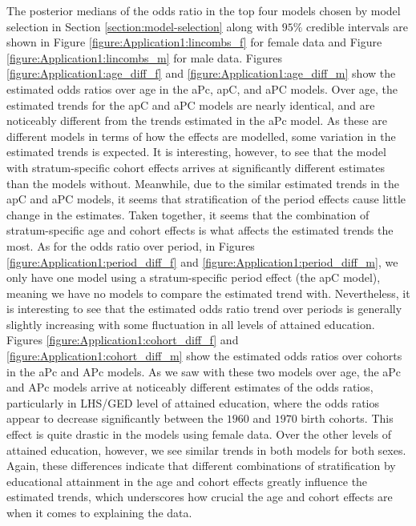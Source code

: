 \vspace{-0.2cm}
The posterior medians of the odds ratio in the top four models chosen by model selection in Section \ref{section:model-selection} along with $95\%$ credible intervals are shown in Figure \ref{figure:Application1:lincombs_f} for female data and Figure \ref{figure:Application1:lincombs_m} for male data. Figures \ref{figure:Application1:age_diff_f} and \ref{figure:Application1:age_diff_m} show the estimated odds ratios over age in the aPc, apC, and aPC models. Over age, the estimated trends for the apC and aPC models are nearly identical, and are noticeably different from the trends estimated in the aPc model. As these are different models in terms of how the effects are modelled, some variation in the estimated trends is expected. It is interesting, however, to see that the model with stratum-specific cohort effects arrives at significantly different estimates than the models without. Meanwhile, due to the similar estimated trends in the apC and aPC models, it seems that stratification of the period effects cause little change in the estimates. Taken together, it seems that the combination of stratum-specific age and cohort effects is what affects the estimated trends the most. As for the odds ratio over period, in Figures \ref{figure:Application1:period_diff_f} and \ref{figure:Application1:period_diff_m}, we only have one model using a stratum-specific period effect (the apC model), meaning we have no models to compare the estimated trend with. Nevertheless, it is interesting to see that the estimated odds ratio trend over periods is generally slightly increasing with some fluctuation in all levels of attained education. Figures \ref{figure:Application1:cohort_diff_f} and \ref{figure:Application1:cohort_diff_m} show the estimated odds ratios over cohorts in the aPc and APc models. As we saw with these two models over age, the aPc and APc models arrive at noticeably different estimates of the odds ratios, particularly in LHS/GED level of attained education, where the odds ratios appear to decrease significantly between the $1960$ and $1970$ birth cohorts. This effect is quite drastic in the models using female data. Over the other levels of attained education, however, we see similar trends in both models for both sexes. Again, these differences indicate that different combinations of stratification by educational attainment in the age and cohort effects greatly influence the estimated trends, which underscores how crucial the age and cohort effects are when it comes to explaining the data.

